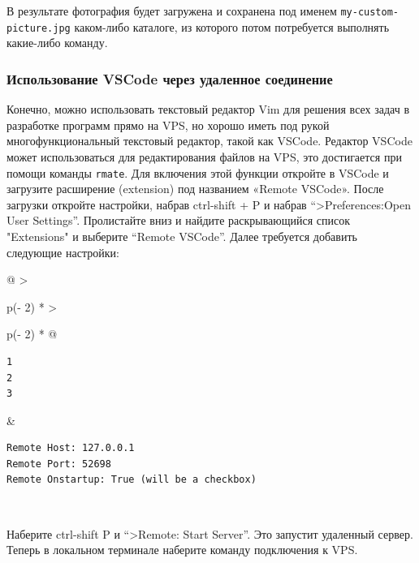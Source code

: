 \documentclass{article}
\begin{document}
В результате фотография будет загружена и сохранена под именем
\texttt{my-custom-picture.jpg} каком-либо каталоге, из которого потом
потребуется выполнять какие-либо команду.

\hypertarget{Using-VSCode-with-your-remote-machine}{%
\subsubsection{\texorpdfstring{\protect\hyperlink{Using-VSCode-with-your-remote-machine}{}Использование
VSCode через удаленное
соединение}{Использование VSCode через удаленное соединение}}\label{Using-VSCode-with-your-remote-machine}}

Конечно, можно использовать текстовый редактор Vim для решения всех
задач в разработке программ прямо на VPS, но хорошо иметь под рукой
многофункциональный текстовый редактор, такой как VSCode. Редактор
VSCode может использоваться для редактирования файлов на VPS, это
достигается при помощи команды \texttt{rmate}. Для включения этой
функции откройте в VSCode и загрузите расширение (extension) под
названием «Remote VSCode». После загрузки откройте настройки, набрав
ctrl-shift + P и набрав ``\textgreater Preferences:Open User Settings''.
Пролистайте вниз и найдите раскрывающийся список "Extensions" и выберите
``Remote VSCode''. Далее требуется добавить следующие настройки:

\begin{longtable}[]{@{}
  >{\raggedright\arraybackslash}p{(\columnwidth - 2\tabcolsep) * }
  >{\raggedright\arraybackslash}p{(\columnwidth - 2\tabcolsep) * }@{}}
\toprule
\endhead
\begin{minipage}[t]{\linewidth}\raggedright
\begin{verbatim}
1
2
3
\end{verbatim}
\end{minipage} & \begin{minipage}[t]{\linewidth}\raggedright
\begin{verbatim}
Remote Host: 127.0.0.1
Remote Port: 52698
Remote Onstartup: True (will be a checkbox)
\end{verbatim}
\end{minipage} \\ \addlinespace
\bottomrule
\end{longtable}

Наберите ctrl-shift P и ``\textgreater Remote: Start Server''. Это
запустит удаленный сервер. Теперь в локальном терминале наберите команду
подключения к VPS.
\end{document}
